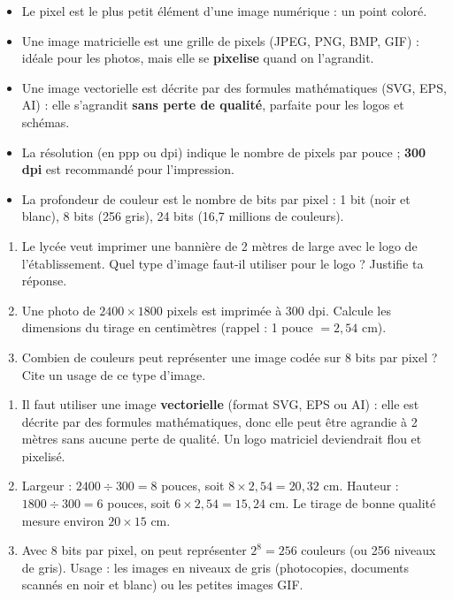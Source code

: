 \documentclass[11pt]{article}
\newcommand{\cle}[1]{{\popxbold\color{popdark}#1}}
\begin{document}
\begin{aretenir}
\begin{itemize}
  \item Le \cle{pixel} est le plus petit élément d'une image numérique : un point coloré.
  \item Une image \cle{matricielle} est une grille de pixels (JPEG, PNG, BMP, GIF) : idéale pour les photos, mais elle se \textbf{pixelise} quand on l'agrandit.
  \item Une image \cle{vectorielle} est décrite par des formules mathématiques (SVG, EPS, AI) : elle s'agrandit \textbf{sans perte de qualité}, parfaite pour les logos et schémas.
  \item La \cle{résolution} (en ppp ou dpi) indique le nombre de pixels par pouce ; \textbf{300 dpi} est recommandé pour l'impression.
  \item La \cle{profondeur de couleur} est le nombre de bits par pixel : 1 bit (noir et blanc), 8 bits (256 gris), 24 bits (16,7 millions de couleurs).
\end{itemize}
\end{aretenir}

\begin{exercice}
\begin{enumerate}
  \item Le lycée veut imprimer une bannière de 2 mètres de large avec le logo de l'établissement. Quel type d'image faut-il utiliser pour le logo ? Justifie ta réponse.
  \item Une photo de $2400 \times 1800$ pixels est imprimée à 300 dpi. Calcule les dimensions du tirage en centimètres (rappel : 1 pouce $= 2,54$ cm).
  \item Combien de couleurs peut représenter une image codée sur 8 bits par pixel ? Cite un usage de ce type d'image.
\end{enumerate}
\end{exercice}

\begin{corrige}
\begin{enumerate}
  \item Il faut utiliser une image \textbf{vectorielle} (format SVG, EPS ou AI) : elle est décrite par des formules mathématiques, donc elle peut être agrandie à 2 mètres sans aucune perte de qualité. Un logo matriciel deviendrait flou et pixelisé.
  \item Largeur : $2400 \div 300 = 8$ pouces, soit $8 \times 2,54 = 20,32$ cm. Hauteur : $1800 \div 300 = 6$ pouces, soit $6 \times 2,54 = 15,24$ cm. Le tirage de bonne qualité mesure environ $20 \times 15$ cm.
  \item Avec 8 bits par pixel, on peut représenter $2^8 = 256$ couleurs (ou 256 niveaux de gris). Usage : les images en niveaux de gris (photocopies, documents scannés en noir et blanc) ou les petites images GIF.
\end{enumerate}
\end{corrige}
\end{document}
